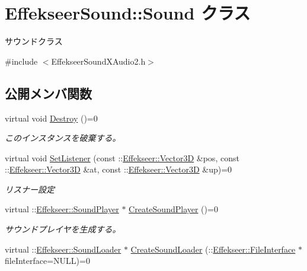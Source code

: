 \hypertarget{class_effekseer_sound_1_1_sound}{}\section{Effekseer\+Sound\+:\+:Sound クラス}
\label{class_effekseer_sound_1_1_sound}


サウンドクラス  




{\ttfamily \#include $<$Effekseer\+Sound\+X\+Audio2.\+h$>$}

\subsection*{公開メンバ関数}
\begin{DoxyCompactItemize}
\item 
virtual void \mbox{\hyperlink{class_effekseer_sound_1_1_sound_ab7d6353d4c6a646f13f9f9a0e8fc4442}{Destroy}} ()=0
\begin{DoxyCompactList}\small\item\em このインスタンスを破棄する。 \end{DoxyCompactList}\item 
virtual void \mbox{\hyperlink{class_effekseer_sound_1_1_sound_a51e602676cb58f1886cb1b54096af7a9}{Set\+Listener}} (const \+::\mbox{\hyperlink{struct_effekseer_1_1_vector3_d}{Effekseer\+::\+Vector3D}} \&pos, const \+::\mbox{\hyperlink{struct_effekseer_1_1_vector3_d}{Effekseer\+::\+Vector3D}} \&at, const \+::\mbox{\hyperlink{struct_effekseer_1_1_vector3_d}{Effekseer\+::\+Vector3D}} \&up)=0
\begin{DoxyCompactList}\small\item\em リスナー設定 \end{DoxyCompactList}\item 
virtual \+::\mbox{\hyperlink{class_effekseer_1_1_sound_player}{Effekseer\+::\+Sound\+Player}} $\ast$ \mbox{\hyperlink{class_effekseer_sound_1_1_sound_a7cef781e83f88596f8a8405bbedceeba}{Create\+Sound\+Player}} ()=0
\begin{DoxyCompactList}\small\item\em サウンドプレイヤを生成する。 \end{DoxyCompactList}\item 
virtual \+::\mbox{\hyperlink{class_effekseer_1_1_sound_loader}{Effekseer\+::\+Sound\+Loader}} $\ast$ \mbox{\hyperlink{class_effekseer_sound_1_1_sound_a34cb29c40b5f75fa9930f92d980589c2}{Create\+Sound\+Loader}} (\+::\mbox{\hyperlink{class_effekseer_1_1_file_interface}{Effekseer\+::\+File\+Interface}} $\ast$file\+Interface=N\+U\+LL)=0

\end{DoxyCompactItemize}
